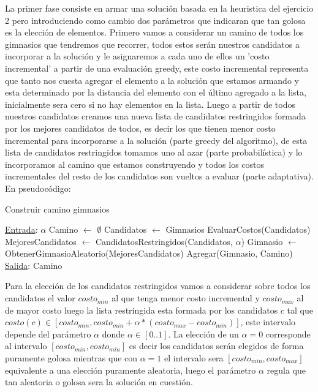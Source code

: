 La primer fase consiste en armar una solución basada en la heuristica del ejercicio 2 pero introduciendo como cambio dos parámetros que indicaran que tan golosa es la elección de elementos. Primero vamos a considerar un camino de todos los gimnasios que tendremos que recorrer, todos estos serán nuestros candidatos a incorporar a la solución y le asignaremos a cada uno de ellos un 'costo incremental' a partir de una evaluación greedy, este costo incremental representa que tanto nos cuesta agregar el elemento a la solución que estamos armando y esta determinado por la distancia del elemento con el último agregado a la lista, inicialmente sera cero si no hay elementos en la lista. Luego a partir de todos nuestros candidatos creamos una nueva lista de candidatos restringidos formada por los mejores candidatos de todos, es decir los que tienen menor costo incremental para incorporarse a la solución (parte greedy del algoritmo), de esta lista de candidatos restringidos tomamos uno al azar (parte probabilística) y lo incorporamos al camino que estamos construyendo y todos los costos incrementales del resto de los candidatos son vueltos a evaluar (parte adaptativa). En pseudocódigo:

\begin{algorithm}[H]

\label{}
\caption{Construir camino gimnasios}

\begin{algorithmic}[1]

\Statex \underline{Entrada}: $\alpha$
\medskip
\State Camino $\gets$ $\emptyset$
\State Candidatos $\gets$ Gimnasios
    \State EvaluarCostos(Candidatos)
	\State MejoresCandidatos $\gets$ CandidatosRestringidos(Candidatos, $\alpha$)
	\State Gimnasio $\gets$ ObtenerGimnasioAleatorio(MejoresCandidatos)
	\State Agregar(Gimnasio, Camino)
\EndWhile
\medskip
\Statex \underline{Salida}: Camino

\end{algorithmic}
\end{algorithm}

Para la elección de los candidatos restringidos vamos a considerar sobre todos los candidatos el valor $costo_{min}$ al que tenga menor costo incremental y $costo_{max}$ al de mayor costo luego la lista restringida esta formada por los candidatos $c$ tal que $costo(c) \in [costo_{min}, costo_{min} + \alpha * (costo_{max} - costo_{min})]$, este intervalo depende del parámetro $\alpha$ donde $\alpha \in [0..1]$. La elección de un $\alpha = 0$ corresponde al intervalo $[costo_{min}, costo_{min}]$ es decir los candidatos serán elegidos de forma puramente golosa mientras que con $\alpha = 1$ el intervalo sera $[costo_{min}, costo_{max}]$ equivalente a una elección puramente aleatoria, luego el parámetro $\alpha$ regula que tan aleatoria o golosa sera la solución en cuestión.

